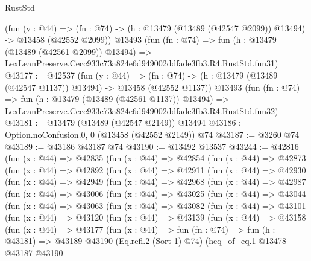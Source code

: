 \begin{lexlean}{RustStd}
\begin{coremodule}
    (fun (y : @44) =>
    (fn : @74) -> (h : @13479 (@13489 (@42547 @2099)) @13494) -> @13458 (@42552 @2099))
    @13493
    (fun (fn : @74) =>
    fun (h : @13479 (@13489 (@42561 @2099)) @13494) =>
    LexLeanPreserve.Cecc933c73a824e6d949002ddfade3fb3.R4.RustStd.fun31)
@43177 := @42537
    (fun (y : @44) =>
    (fn : @74) -> (h : @13479 (@13489 (@42547 @1137)) @13494) -> @13458 (@42552 @1137))
    @13493
    (fun (fn : @74) =>
    fun (h : @13479 (@13489 (@42561 @1137)) @13494) =>
    LexLeanPreserve.Cecc933c73a824e6d949002ddfade3fb3.R4.RustStd.fun32)
@43181 := @13479 (@13489 (@42547 @2149)) @13494
@43186 := Option.noConfusion.{0, 0} (@13458 (@42552 @2149)) @74
@43187 := @3260 @74
@43189 := @43186 @43187 @74
@43190 := @13492 @13537
@43244 := @42816
    (fun (x : @44) =>
    @42835
      (fun (x : @44) =>
      @42854
        (fun (x : @44) =>
        @42873
          (fun (x : @44) =>
          @42892
            (fun (x : @44) =>
            @42911
              (fun (x : @44) =>
              @42930
                (fun (x : @44) =>
                @42949
                  (fun (x : @44) =>
                  @42968
                    (fun (x : @44) =>
                    @42987
                      (fun (x : @44) =>
                      @43006
                        (fun (x : @44) =>
                        @43025
                          (fun (x : @44) =>
                          @43044
                            (fun (x : @44) =>
                            @43063
                              (fun (x : @44) =>
                              @43082
                                (fun (x : @44) =>
                                @43101
                                  (fun (x : @44) =>
                                  @43120
                                    (fun (x : @44) =>
                                    @43139
                                      (fun (x : @44) =>
                                      @43158
                                        (fun (x : @44) =>
                                        @43177
                                          (fun (x : @44) =>
                                          fun (fn : @74) =>
                                          fun (h : @43181) =>
                                          @43189
                                            @43190
                                            (Eq.refl.{2} (Sort 1) @74)
                                            (heq_of_eq.{1}
                                              @13478
                                              @43187
                                              @43190

\end{coremodule}
\end{lexlean}
